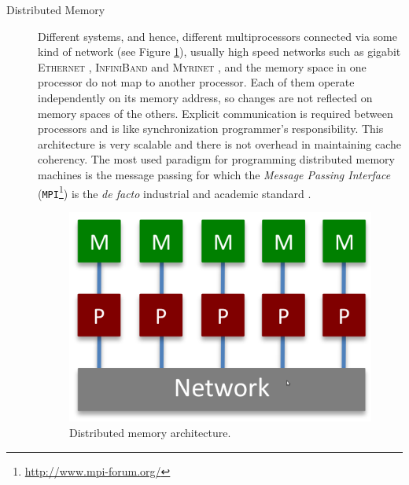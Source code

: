 \begin{description}
\begin{description}
	\item [Distributed Memory] 	Different systems, and hence, different multiprocessors connected via some kind of network (see Figure \ref{fig:distribuiteMemory}), usually high speed networks such as gigabit \textsc{Ethernet} \cite{Spurgeon:2000:EDG:336070}, \textsc{InfiniBand} \cite{Shanley:2002:INF:579371} and \textsc{Myrinet} \cite{Boden:1995:MGL:623261.623898}, and the memory space in one processor do not map to another processor. Each of them operate independently on its memory address, so changes are not reflected on memory spaces of the others. Explicit communication is required between processors and is like synchronization	programmer's responsibility.
	This architecture  is very scalable and there is not  overhead in maintaining	cache coherency. 	
	The most used paradigm for programming distributed memory machines is the
	message passing for which the \textit{Message Passing Interface} (\texttt{MPI}\footnote{\url{http://www.mpi-forum.org/}}) \cite{Forum:1994:MMI:898758,Gropp:1999:UMA:555151} is the \textit{de facto} industrial and academic standard 
 .
	\begin{figure}
		\centering
		\caption{Distributed memory architecture.}
		\label{fig:distribuiteMemory}
		\setlength{\fboxrule}{1pt}%
		\includegraphics[scale=0.25]{./images/parallel_programming/distribuitedMemory}
	\end{figure}
	

\end{description}
\end{description}
